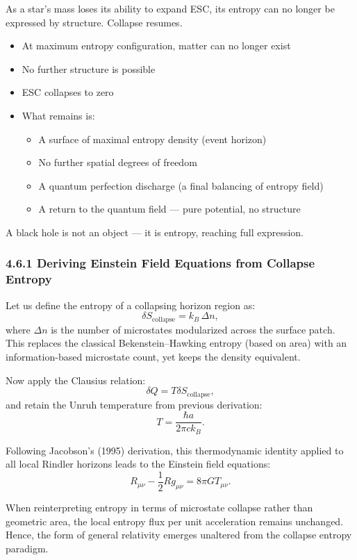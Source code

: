 \documentclass[12pt]{article}
\begin{document}
As a star’s mass loses its ability to expand ESC, its entropy can no longer be expressed by structure. Collapse resumes.

\begin{itemize}
    \item At maximum entropy configuration, matter can no longer exist
    \item No further structure is possible
    \item ESC collapses to zero
    \item What remains is:
    \begin{itemize}
        \item A surface of maximal entropy density (event horizon)
        \item No further spatial degrees of freedom
        \item A quantum perfection discharge (a final balancing of entropy field)
        \item A return to the quantum field — pure potential, no structure
    \end{itemize}
\end{itemize}

\noindent
A black hole is not an object — it is entropy, reaching full expression.

\subsubsection*{4.6.1 Deriving Einstein Field Equations from Collapse Entropy}

Let us define the entropy of a collapsing horizon region as:
\[
\delta S_{\text{collapse}} = k_B\, \Delta n,
\]
where \( \Delta n \) is the number of microstates modularized across the surface patch. This replaces the classical Bekenstein–Hawking entropy (based on area) with an information-based microstate count, yet keeps the density equivalent.

Now apply the Clausius relation:
\[
\delta Q = T \delta S_{\text{collapse}},
\]
and retain the Unruh temperature from previous derivation:
\[
T = \frac{\hbar a}{2\pi c k_B}.
\]

Following Jacobson’s (1995) derivation, this thermodynamic identity applied to all local Rindler horizons leads to the Einstein field equations:
\[
R_{\mu\nu} - \frac{1}{2} R g_{\mu\nu} = 8\pi G T_{\mu\nu}.
\]

When reinterpreting entropy in terms of microstate collapse rather than geometric area, the local entropy flux per unit acceleration remains unchanged. Hence, the form of general relativity emerges unaltered from the collapse entropy paradigm.
\end{document}
